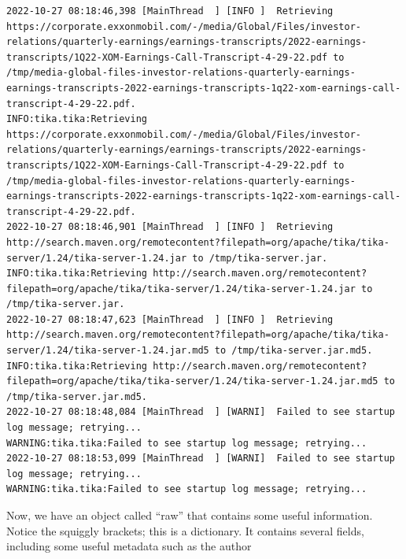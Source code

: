 \documentclass[
  letterpaper,
  DIV=11,
  numbers=noendperiod]{scrreprt}
\begin{document}
\begin{verbatim}
2022-10-27 08:18:46,398 [MainThread  ] [INFO ]  Retrieving https://corporate.exxonmobil.com/-/media/Global/Files/investor-relations/quarterly-earnings/earnings-transcripts/2022-earnings-transcripts/1Q22-XOM-Earnings-Call-Transcript-4-29-22.pdf to /tmp/media-global-files-investor-relations-quarterly-earnings-earnings-transcripts-2022-earnings-transcripts-1q22-xom-earnings-call-transcript-4-29-22.pdf.
INFO:tika.tika:Retrieving https://corporate.exxonmobil.com/-/media/Global/Files/investor-relations/quarterly-earnings/earnings-transcripts/2022-earnings-transcripts/1Q22-XOM-Earnings-Call-Transcript-4-29-22.pdf to /tmp/media-global-files-investor-relations-quarterly-earnings-earnings-transcripts-2022-earnings-transcripts-1q22-xom-earnings-call-transcript-4-29-22.pdf.
2022-10-27 08:18:46,901 [MainThread  ] [INFO ]  Retrieving http://search.maven.org/remotecontent?filepath=org/apache/tika/tika-server/1.24/tika-server-1.24.jar to /tmp/tika-server.jar.
INFO:tika.tika:Retrieving http://search.maven.org/remotecontent?filepath=org/apache/tika/tika-server/1.24/tika-server-1.24.jar to /tmp/tika-server.jar.
2022-10-27 08:18:47,623 [MainThread  ] [INFO ]  Retrieving http://search.maven.org/remotecontent?filepath=org/apache/tika/tika-server/1.24/tika-server-1.24.jar.md5 to /tmp/tika-server.jar.md5.
INFO:tika.tika:Retrieving http://search.maven.org/remotecontent?filepath=org/apache/tika/tika-server/1.24/tika-server-1.24.jar.md5 to /tmp/tika-server.jar.md5.
2022-10-27 08:18:48,084 [MainThread  ] [WARNI]  Failed to see startup log message; retrying...
WARNING:tika.tika:Failed to see startup log message; retrying...
2022-10-27 08:18:53,099 [MainThread  ] [WARNI]  Failed to see startup log message; retrying...
WARNING:tika.tika:Failed to see startup log message; retrying...
\end{verbatim}

Now, we have an object called ``raw'' that contains some useful
information. Notice the squiggly brackets; this is a dictionary. It
contains several fields, including some useful metadata such as the
author
\end{document}
